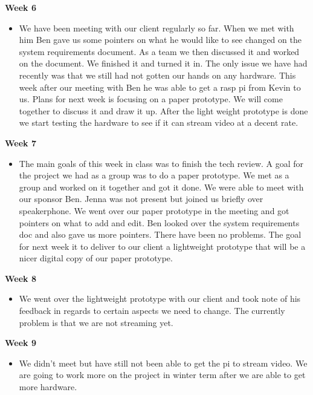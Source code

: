             \textbf{Week 6}
            \begin{itemize}
                \item We have been meeting with our client regularly so far. When we met with him Ben gave us some pointers on what he would like to see changed on the system requirements document. As a team we then discussed it and worked on the document. We finished it and turned it in. The only issue we have had recently was that we still had not gotten our hands on any hardware. This week after our meeting with Ben he was able to get a rasp pi from Kevin to us. Plans for next week is focusing on a paper prototype. We will come together to discuss it and draw it up. After the light weight prototype is done we start testing the hardware to see if it can stream video at a decent rate.
            \end{itemize}
            \newpage
            \textbf{Week 7}
            \begin{itemize}
                \item The main goals of this week in class was to finish the tech review. A goal for the project we had as a group was to do a paper prototype. We met as a group and worked on it together and got it done. We were able to meet with our sponsor Ben. Jenna was not present but joined us briefly over speakerphone. We went over our paper prototype in the meeting and got pointers on what to add and edit. Ben looked over the system requirements doc and also gave us more pointers. There have been no problems. The goal for next week it to deliver to our client a lightweight prototype that will be a nicer digital copy of our paper prototype.
            \end{itemize}
            
            \textbf{Week 8}
            \begin{itemize}
                \item We went over the lightweight prototype with our client and took note of his feedback in regards to certain aspects we need to change. The currently problem is that we are not streaming yet.
            \end{itemize}
            
            \textbf{Week 9}
            \begin{itemize}
                \item We didn't meet but have still not been able to get the pi to stream video. We are going to work more on the project in winter term after we are able to get more hardware.
            \end{itemize}
    
